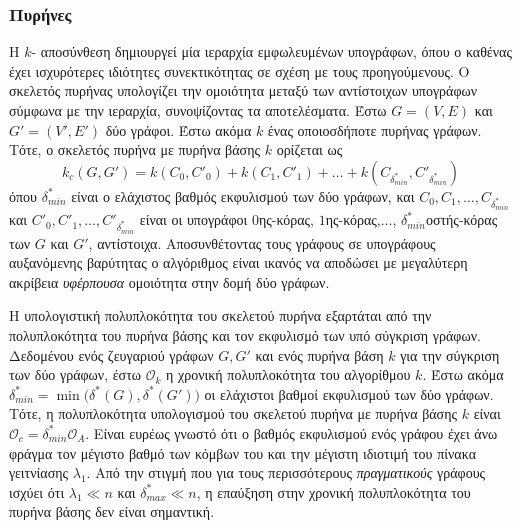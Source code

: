 \subsubsection{ Πυρήνες}
Η $k$- αποσύνθεση δημιουργεί μία ιεραρχία εμφωλευμένων υπογράφων, όπου ο καθένας έχει ισχυρότερες ιδιότητες συνεκτικότητας σε σχέση με τους προηγούμενους.
Ο  σκελετός πυρήνας υπολογίζει την ομοιότητα μεταξύ των αντίστοιχων υπογράφων σύμφωνα με την  ιεραρχία,  συνοψίζοντας τα αποτελέσματα.
Έστω $G=(V,E)$ και $G'=(V',E')$ δύο γράφοι.
Έστω ακόμα $k$ ένας οποιοσδήποτε πυρήνας γράφων.
Τότε, ο σκελετός πυρήνα  με πυρήνα βάσης $k$ ορίζεται ως
\begin{equation}
  k_c(G, G') = k(C_0,C'_0) + k(C_1,C'_1) + \ldots + k(C_{\delta^*_{min}},C'_{\delta^*_{min}}) 
\end{equation}
όπου $\delta^*_{min}$ είναι ο ελάχιστος βαθμός εκφυλισμού των δύο γράφων, και $C_0,C_1,\ldots,C_{\delta^*_{min}}$ και $C'_0,C'_1,\ldots,C'_{\delta^*_{min}}$ είναι οι υπογράφοι $0$ης-κόρας, $1$ης-κόρας,$\ldots$, $\delta^*_{min}$οστής-κόρας των $G$ και $G'$, αντίστοιχα.
Αποσυνθέτοντας τους γράφους σε υπογράφους αυξανόμενης βαρύτητας ο αλγόριθμος είναι ικανός να αποδώσει με μεγαλύτερη ακρίβεια \textit{υφέρπουσα} ομοιότητα στην δομή δύο γράφων.\par
Η υπολογιστική πολυπλοκότητα του σκελετού πυρήνα  εξαρτάται από την πολυπλοκότητα του πυρήνα βάσης και τον εκφυλισμό των υπό σύγκριση γράφων.
Δεδομένου ενός ζευγαριού γράφων $G, G'$ και ενός πυρήνα βάση $k$ για την σύγκριση των δύο γράφων, έστω $\mathcal{O}_k$ η χρονική πολυπλοκότητα του αλγορίθμου $k$.
Έστω ακόμα $\delta^*_{min} = \min \big( \delta^*(G),\delta^*(G') \big)$ οι ελάχιστοι βαθμοί εκφυλισμού των δύο γράφων.
Τότε, η πολυπλοκότητα υπολογισμού του σκελετού πυρήνα  με πυρήνα βάσης $k$ είναι $\mathcal{O}_{c}=\delta^*_{min}\mathcal{O}_A$.
Είναι ευρέως γνωστό ότι ο βαθμός εκφυλισμού ενός γράφου έχει άνω φράγμα τον μέγιστο βαθμό των κόμβων του και την μέγιστη ιδιοτιμή του πίνακα γειτνίασης $\lambda_1$.
Από την στιγμή που για τους περισσότερους \textit{πραγματικούς} γράφους ισχύει ότι $\lambda_1 \ll n$ και $\delta^*_{max} \ll n$, η επαύξηση στην χρονική πολυπλοκότητα του πυρήνα βάσης δεν είναι σημαντική.

